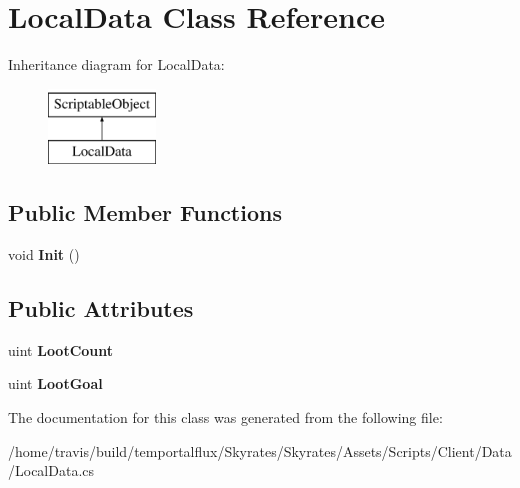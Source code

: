 \hypertarget{class_local_data}{\section{Local\-Data Class Reference}
\label{class_local_data}
}
Inheritance diagram for Local\-Data\-:\begin{figure}[H]
\begin{center}
\leavevmode
\includegraphics[height=2.000000cm]{class_local_data}
\end{center}
\end{figure}
\subsection*{Public Member Functions}
\begin{DoxyCompactItemize}
\item 
\hypertarget{class_local_data_ae6ee4e5706247ca36e5d20308dd4627c}{void {\bfseries Init} ()}\label{class_local_data_ae6ee4e5706247ca36e5d20308dd4627c}

\end{DoxyCompactItemize}
\subsection*{Public Attributes}
\begin{DoxyCompactItemize}
\item 
\hypertarget{class_local_data_a93c7829979ce9e532b31f6b1fd7285fa}{uint {\bfseries Loot\-Count}}\label{class_local_data_a93c7829979ce9e532b31f6b1fd7285fa}

\item 
\hypertarget{class_local_data_ad99518a37a233753c7f3333b1202b59f}{uint {\bfseries Loot\-Goal}}\label{class_local_data_ad99518a37a233753c7f3333b1202b59f}

\end{DoxyCompactItemize}


The documentation for this class was generated from the following file\-:\begin{DoxyCompactItemize}
\item 
/home/travis/build/temportalflux/\-Skyrates/\-Skyrates/\-Assets/\-Scripts/\-Client/\-Data/Local\-Data.\-cs\end{DoxyCompactItemize}
